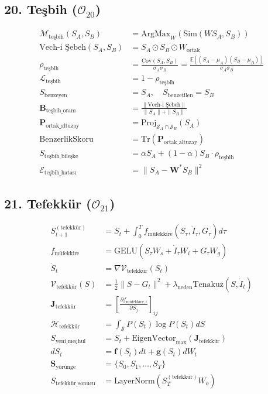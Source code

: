 \documentclass[11pt, a4paper]{article}
\begin{document}
\subsection{20. Teşbih ($\mathcal{O}_{20}$)}
\begin{align}
\mathcal{M}_{\text{teşbih}}(S_A, S_B) &= \text{ArgMax}_{W} \left( \text{Sim}(W S_A, S_B) \right) \\
\text{Vech-i Şebeh}(S_A, S_B) &= S_A \odot S_B \odot W_{\text{ortak}} \\
\rho_{\text{teşbih}} &= \frac{\text{Cov}(S_A, S_B)}{\sigma_A \sigma_B} = \frac{\mathbb{E}[(S_A - \mu_A)(S_B - \mu_B)]}{\sigma_A \sigma_B} \\
\mathcal{L}_{\text{teşbih}} &= 1 - \rho_{\text{teşbih}} \\
S_{\text{benzeyen}} &= S_A, \quad S_{\text{benzetilen}} = S_B \\
\mathbf{B}_{\text{teşbih\_oranı}} &= \frac{\| \text{Vech-i Şebeh} \|}{\|S_A\| + \|S_B\|} \\
\mathbf{P}_{\text{ortak\_altuzay}} &= \text{Proj}_{\mathcal{S}_A \cap \mathcal{S}_B}(S_A) \\
\text{BenzerlikSkoru} &= \text{Tr}(\mathbf{P}_{\text{ortak\_altuzay}}) \\
S_{\text{teşbih\_bileşke}} &= \alpha S_A + (1-\alpha) S_B \cdot \rho_{\text{teşbih}} \\
\mathcal{E}_{\text{teşbih\_hatası}} &= \| S_A - \mathbf{W}^* S_B \|^2
\end{align}

\subsection{21. Tefekkür ($\mathcal{O}_{21}$)}
\begin{align}
S_{t+1}^{(\text{tefekkür})} &= S_t + \int_{0}^T f_{\text{müfekkire}}(S_\tau, \dot{I}_\tau, G_\tau) d\tau \\
f_{\text{müfekkire}} &= \text{GELU}(S_\tau W_s + \dot{I}_\tau W_i + G_\tau W_g) \\
\dot{S}_t &= \nabla \mathcal{V}_{\text{tefekkür}}(S_t) \\
\mathcal{V}_{\text{tefekkür}}(S) &= \frac{1}{2} \|S - G_t\|^2 + \lambda_{\text{neden}} \text{Tenakuz}(S, \dot{I}_t) \\
\mathbf{J}_{\text{tefekkür}} &= \left[ \frac{\partial f_{\text{müfekkire}, i}}{\partial S_j} \right]_{ij} \\
\mathcal{H}_{\text{tefekkür}} &= \int_{\mathcal{S}} P(S_t) \log P(S_t) dS \\
S_{\text{yeni\_meçhul}} &= S_t + \text{EigenVector}_{\max}(\mathbf{J}_{\text{tefekkür}}) \\
d S_t &= \mathbf{f}(S_t) dt + \mathbf{g}(S_t) dW_t \\
\mathbf{S}_{\text{yörünge}} &= \{ S_0, S_1, \dots, S_T \} \\
S_{\text{tefekkür\_sonucu}} &= \text{LayerNorm}(S_T^{(\text{tefekkür})} W_o)
\end{align}
\end{document}
